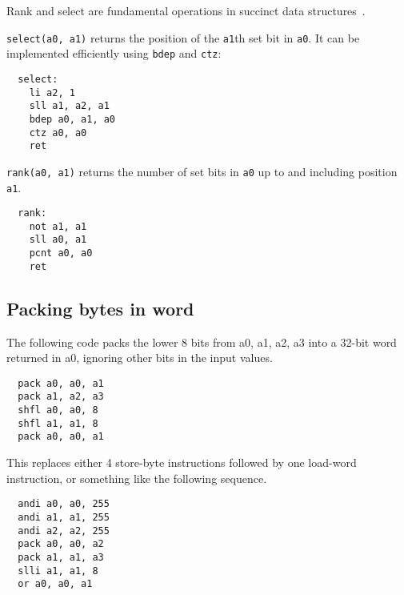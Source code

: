 Rank and select are fundamental operations in succinct data structures~\cite{SelectX86}.

\texttt{select(a0, a1)} returns the position of the \texttt{a1}th set bit in \texttt{a0}.
It can be implemented efficiently using \texttt{bdep} and \texttt{ctz}:

\begin{minipage}{\linewidth}
\begin{verbatim}
  select:
    li a2, 1
    sll a1, a2, a1
    bdep a0, a1, a0
    ctz a0, a0
    ret
\end{verbatim}
\end{minipage}

\texttt{rank(a0, a1)} returns the number of set bits in \texttt{a0} up to and
including position \texttt{a1}.

\begin{minipage}{\linewidth}
\begin{verbatim}
  rank:
    not a1, a1
    sll a0, a1
    pcnt a0, a0
    ret
\end{verbatim}
\end{minipage}


\subsection{Packing bytes in word}

The following code packs the lower 8 bits from a0, a1, a2, a3 into
a 32-bit word returned in a0, ignoring other bits in the input values.

\begin{minipage}{\linewidth}
\begin{verbatim}
  pack a0, a0, a1
  pack a1, a2, a3
  shfl a0, a0, 8
  shfl a1, a1, 8
  pack a0, a0, a1
\end{verbatim}
\end{minipage}

This replaces either 4 store-byte instructions followed by one load-word
instruction, or something like the following sequence.

\begin{minipage}{\linewidth}
\begin{verbatim}
  andi a0, a0, 255
  andi a1, a1, 255
  andi a2, a2, 255
  pack a0, a0, a2
  pack a1, a1, a3
  slli a1, a1, 8
  or a0, a0, a1
\end{verbatim}
\end{minipage}

